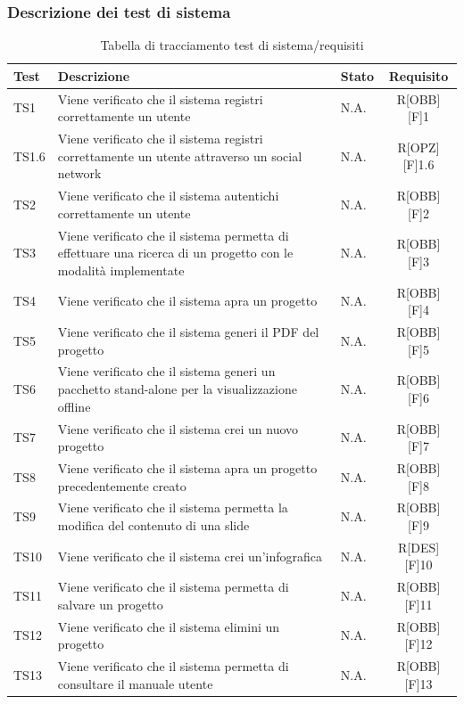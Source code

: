 \subsubsection{Descrizione dei test di sistema}
\begin{center}
	\begin{table}[h]
		\begin{tabular}{|l|p{}|l|c|}
			\toprule
			
			\textbf{Test} & \textbf{Descrizione} & \textbf{Stato} & \textbf{Requisito} \\
			
			\midrule
			TS1 & Viene verificato che il sistema registri correttamente un utente & N.A. & R[OBB][F]1\\ \midrule
			TS1.6 & Viene verificato che il sistema registri correttamente un utente attraverso un social network & N.A. & R[OPZ][F]1.6\\ \midrule
			TS2 & Viene verificato che il sistema autentichi correttamente un utente & N.A. & R[OBB][F]2\\  \midrule
			TS3	& Viene verificato che il sistema permetta di effettuare una ricerca di un progetto con le modalità implementate & N.A. & R[OBB][F]3\\ \midrule
			TS4	& Viene verificato che il sistema apra un progetto & N.A. & R[OBB][F]4\\ \midrule
			TS5 & Viene verificato che il sistema generi il PDF del progetto & N.A. & R[OBB][F]5\\ \midrule
			TS6 & Viene verificato che il sistema generi un pacchetto stand-alone per la visualizzazione offline & N.A. & R[OBB][F]6\\ \midrule
			TS7 & Viene verificato che il sistema crei un nuovo progetto & N.A. & R[OBB][F]7\\ \midrule
			TS8 & Viene verificato che il sistema apra un progetto precedentemente creato & N.A. & R[OBB][F]8\\ \midrule
			TS9 & Viene verificato che il sistema permetta la modifica del contenuto di una \gls{slide} & N.A. & R[OBB][F]9\\ \midrule
			TS10 & Viene verificato che il sistema crei un'\gls{infografica} & N.A. & R[DES][F]10\\ \midrule
			TS11 & Viene verificato che il sistema permetta di salvare un progetto & N.A. & R[OBB][F]11\\ \midrule
			TS12 & Viene verificato che il sistema elimini un progetto & N.A. & R[OBB][F]12\\ \midrule
			TS13 & Viene verificato che il sistema permetta di consultare il manuale utente & N.A. & R[OBB][F]13\\
			
						
			\bottomrule
			
		\end{tabular}
		\caption{Tabella di tracciamento test di sistema/requisiti}
		
	\end{table}
	
\end{center}

